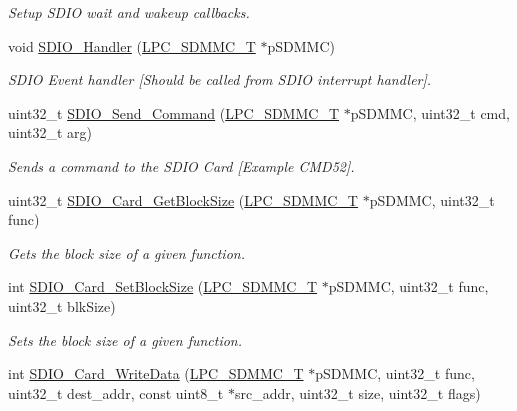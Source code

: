 \begin{DoxyCompactItemize}
\begin{DoxyCompactList}\small\item\em Setup S\+D\+IO wait and wakeup callbacks. \end{DoxyCompactList}\item 
void \hyperlink{group___s_d_i_o__18_x_x__43_x_x_ga9aa586377c061d1d7aa399ce381798eb}{S\+D\+I\+O\+\_\+\+Handler} (\hyperlink{struct_l_p_c___s_d_m_m_c___t}{L\+P\+C\+\_\+\+S\+D\+M\+M\+C\+\_\+T} $\ast$p\+S\+D\+M\+MC)
\begin{DoxyCompactList}\small\item\em S\+D\+IO Event handler \mbox{[}Should be called from S\+D\+IO interrupt handler\mbox{]}. \end{DoxyCompactList}\item 
uint32\+\_\+t \hyperlink{group___s_d_i_o__18_x_x__43_x_x_gab8b5702f6354718338b7d8fbdd25fd92}{S\+D\+I\+O\+\_\+\+Send\+\_\+\+Command} (\hyperlink{struct_l_p_c___s_d_m_m_c___t}{L\+P\+C\+\_\+\+S\+D\+M\+M\+C\+\_\+T} $\ast$p\+S\+D\+M\+MC, uint32\+\_\+t cmd, uint32\+\_\+t arg)
\begin{DoxyCompactList}\small\item\em Sends a command to the S\+D\+IO Card \mbox{[}Example C\+M\+D52\mbox{]}. \end{DoxyCompactList}\item 
uint32\+\_\+t \hyperlink{group___s_d_i_o__18_x_x__43_x_x_gaf6da8cc6d310edac956ffdfce32be97c}{S\+D\+I\+O\+\_\+\+Card\+\_\+\+Get\+Block\+Size} (\hyperlink{struct_l_p_c___s_d_m_m_c___t}{L\+P\+C\+\_\+\+S\+D\+M\+M\+C\+\_\+T} $\ast$p\+S\+D\+M\+MC, uint32\+\_\+t func)
\begin{DoxyCompactList}\small\item\em Gets the block size of a given function. \end{DoxyCompactList}\item 
int \hyperlink{group___s_d_i_o__18_x_x__43_x_x_ga5149b1d9ad72df09f19c32d81673b487}{S\+D\+I\+O\+\_\+\+Card\+\_\+\+Set\+Block\+Size} (\hyperlink{struct_l_p_c___s_d_m_m_c___t}{L\+P\+C\+\_\+\+S\+D\+M\+M\+C\+\_\+T} $\ast$p\+S\+D\+M\+MC, uint32\+\_\+t func, uint32\+\_\+t blk\+Size)
\begin{DoxyCompactList}\small\item\em Sets the block size of a given function. \end{DoxyCompactList}\item 
int \hyperlink{group___s_d_i_o__18_x_x__43_x_x_gab2b52e00bab2f72ab27fca006c48cf19}{S\+D\+I\+O\+\_\+\+Card\+\_\+\+Write\+Data} (\hyperlink{struct_l_p_c___s_d_m_m_c___t}{L\+P\+C\+\_\+\+S\+D\+M\+M\+C\+\_\+T} $\ast$p\+S\+D\+M\+MC, uint32\+\_\+t func, uint32\+\_\+t dest\+\_\+addr, const uint8\+\_\+t $\ast$src\+\_\+addr, uint32\+\_\+t size, uint32\+\_\+t flags)

\end{DoxyCompactItemize}
